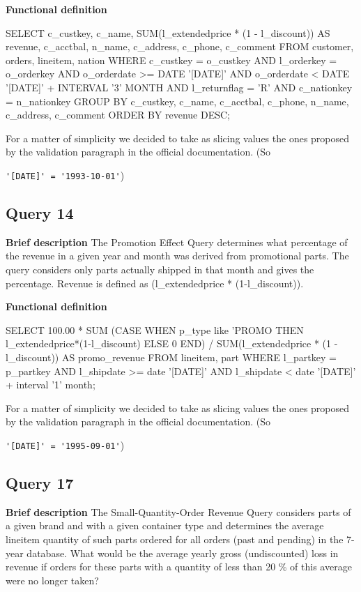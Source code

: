\textbf{Functional definition}
\begin{sql}
SELECT
    c_custkey,
    c_name,
    SUM(l_extendedprice * (1 - l_discount)) AS revenue,
    c_acctbal,
    n_name,
    c_address,
    c_phone,
    c_comment
FROM
    customer,
    orders,
    lineitem,
    nation
WHERE
    c_custkey = o_custkey
    AND l_orderkey = o_orderkey
    AND o_orderdate >= DATE '[DATE]'
    AND o_orderdate < DATE '[DATE]' + INTERVAL '3' MONTH
    AND l_returnflag = 'R'
    AND c_nationkey = n_nationkey
GROUP BY
    c_custkey,
    c_name,
    c_acctbal,
    c_phone,
    n_name,
    c_address,
    c_comment
ORDER BY
    revenue DESC;
\end{sql}

For a matter of simplicity we decided to take as slicing values the ones proposed by the validation paragraph in the official documentation. (So

\verb|'[DATE]' = '1993-10-01'|)

\subsection{Query 14}
\textbf{Brief description}
The Promotion Effect Query determines what percentage of the revenue in a given year and month was derived from 
promotional parts. The query considers only parts actually shipped in that month and gives the percentage. Revenue 
is defined as (l\_extendedprice * (1-l\_discount)).


\textbf{Functional definition}
\begin{sql}
SELECT 
    100.00 * SUM (CASE WHEN p_type like 'PROMO%
                  THEN l_extendedprice*(1-l_discount) 
                  ELSE 0 END) / SUM(l_extendedprice * (1 - l_discount)) 
    AS promo_revenue
FROM 
    lineitem, 
    part
WHERE 
    l_partkey = p_partkey
    AND l_shipdate >= date '[DATE]'
    AND l_shipdate < date '[DATE]' + interval '1' month;

\end{sql}

For a matter of simplicity we decided to take as slicing values the ones proposed by the validation paragraph in the official documentation. (So 

\verb|'[DATE]' = '1995-09-01'|)


\subsection{Query 17}
\textbf{Brief description}
The Small-Quantity-Order Revenue Query considers parts of a given brand and with a given container type and 
determines the average lineitem quantity of such parts ordered for all orders (past and pending) in the 7-year database. What would be the average yearly gross (undiscounted) loss in revenue if orders for these parts with a quantity 
of less than 20 \% of this average were no longer taken?


